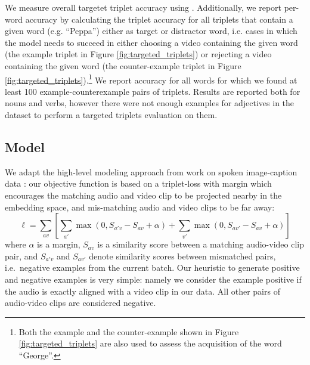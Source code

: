We measure overall targetet triplet accuracy using
. Additionally, we report per-word accuracy by
calculating the triplet accuracy for all triplets that contain a given
word (e.g. ``Peppa'') either as target or distractor word, i.e. cases
in which the model needs to succeed in either choosing a video
containing the given word (the example triplet in Figure
\ref{fig:targeted_triplets}) or rejecting a video containing the given
word (the counter-example triplet in Figure
\ref{fig:targeted_triplets}).\footnote{Both the example and the
  counter-example shown in Figure \ref{fig:targeted_triplets} are also
  used to assess the acquisition of the word ``George''.}  We report
accuracy for all words for which we found at least 100 example-counterexample pairs of triplets. Results are reported both for nouns and verbs, however there were not enough examples for adjectives in the dataset to perform a targeted triplets evaluation on them.



\subsection{Model}

We adapt the high-level modeling approach from work on spoken
image-caption data
\citep{harwath2016unsupervised,chrupala-etal-2017-representations}:
our objective function is based on a triplet-loss with margin which
encourages the matching audio and video clip to be projected nearby in
the embedding space, and mis-matching audio and video clips to be far
away:
\begin{equation}
  \ell = \sum_{av}\left[\sum_{a'} \max(0, S_{a'v} - S_{av} +
    \alpha) + \sum_{v'} \max(0, S_{av'} - S_{av} + \alpha) \right]
  \label{eq:triplet}
\end{equation}
where $\alpha$ is a margin, $S_{av}$ is a similarity score between a
matching audio-video clip pair, and $S_{a'v}$ and $S_{av'}$ denote
similarity scores between mismatched pairs, i.e.\ negative examples
from the current batch. Our heuristic to generate positive and
negative examples is very simple: namely we consider the example
positive if the audio is exactly aligned with a video clip in our
data. All other pairs of audio-video clips are considered negative.

